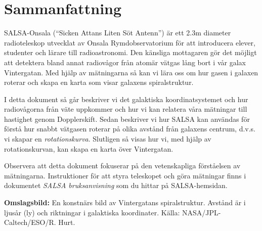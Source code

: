 \chapter*{Sammanfattning}
SALSA-Onsala (``Sicken Attans Liten Söt Antenn'') är ett 2.3m diameter
radioteleskop utvecklat av Onsala Rymdobservatorium för att introducera elever,
studenter och lärare till radioastronomi. Den känsliga mottagaren gör det
möjligt att detektera bland annat radiovågor från atomär vätgas lång bort i vår
galax Vintergatan. Med hjälp av mätningarna så kan vi lära oss om hur gasen i
galaxen roterar och skapa en karta som visar galaxens spiralstruktur.

I detta dokument så går beskriver vi det galaktiska koordinatsystemet och 
hur radiovågorna från väte uppkommer och hur vi kan relatera våra mätningar
till hastighet genom Dopplerskift. Sedan beskriver vi hur SALSA kan användas
för förstå hur snabbt vätgasen roterar på olika avstånd från galaxens centrum,
d.v.s. vi skapar en \emph{rotationskurva}. Slutligen så visas hur vi,
med hjälp av rotationskurvan, kan skapa en karta över Vintergatan.

Observera att detta dokument fokuserar på den vetenskapliga förståelsen
av mätningarna. Instruktioner för att styra teleskopet och göra mätningar
finns i dokumentet \emph{SALSA bruksanvisning} som du hittar på SALSA-hemsidan.

\vspace{9cm}




{\bf Omslagsbild:} En konstnärs bild av Vintergatans spiralstruktur. Avstånd
är i ljusår (ly) och riktningar i galaktiska koordinater. Källa:
NASA/JPL-Caltech/ESO/R. Hurt.
